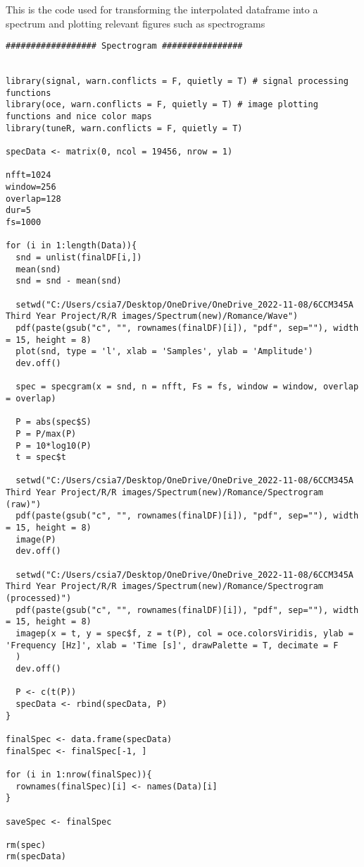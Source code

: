 This is the code used for transforming the interpolated dataframe into a spectrum and plotting relevant figures such as spectrograms
\begin{verbatim}
################## Spectrogram ################


library(signal, warn.conflicts = F, quietly = T) # signal processing functions
library(oce, warn.conflicts = F, quietly = T) # image plotting functions and nice color maps
library(tuneR, warn.conflicts = F, quietly = T) 

specData <- matrix(0, ncol = 19456, nrow = 1)

nfft=1024
window=256
overlap=128
dur=5
fs=1000

for (i in 1:length(Data)){
  snd = unlist(finalDF[i,])
  mean(snd)
  snd = snd - mean(snd)
  
  setwd("C:/Users/csia7/Desktop/OneDrive/OneDrive_2022-11-08/6CCM345A Third Year Project/R/R images/Spectrum(new)/Romance/Wave")
  pdf(paste(gsub("c", "", rownames(finalDF)[i]), "pdf", sep=""), width = 15, height = 8) 
  plot(snd, type = 'l', xlab = 'Samples', ylab = 'Amplitude')
  dev.off() 
  
  spec = specgram(x = snd, n = nfft, Fs = fs, window = window, overlap = overlap)
  
  P = abs(spec$S)
  P = P/max(P)
  P = 10*log10(P)
  t = spec$t
  
  setwd("C:/Users/csia7/Desktop/OneDrive/OneDrive_2022-11-08/6CCM345A Third Year Project/R/R images/Spectrum(new)/Romance/Spectrogram (raw)")
  pdf(paste(gsub("c", "", rownames(finalDF)[i]), "pdf", sep=""), width = 15, height = 8) 
  image(P)
  dev.off() 
  
  setwd("C:/Users/csia7/Desktop/OneDrive/OneDrive_2022-11-08/6CCM345A Third Year Project/R/R images/Spectrum(new)/Romance/Spectrogram (processed)")
  pdf(paste(gsub("c", "", rownames(finalDF)[i]), "pdf", sep=""), width = 15, height = 8) 
  imagep(x = t, y = spec$f, z = t(P), col = oce.colorsViridis, ylab = 'Frequency [Hz]', xlab = 'Time [s]', drawPalette = T, decimate = F
  )
  dev.off()
  
  P <- c(t(P))
  specData <- rbind(specData, P)
}

finalSpec <- data.frame(specData)
finalSpec <- finalSpec[-1, ]

for (i in 1:nrow(finalSpec)){
  rownames(finalSpec)[i] <- names(Data)[i]
}

saveSpec <- finalSpec

rm(spec)
rm(specData)
\end{verbatim}

